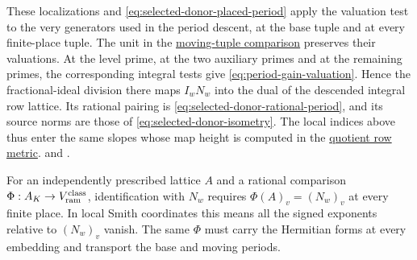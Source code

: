 These localizations and \eqref{eq:selected-donor-placed-period}
apply the valuation test to the very generators used in the
period descent, at the base tuple and at every finite-place tuple.
The unit in the \hyperlink{proof.local-unit-comparison}{moving-tuple comparison}
preserves their valuations. At the level prime, at the two
auxiliary primes and at the remaining primes, the corresponding
integral tests give \eqref{eq:period-gain-valuation}. Hence the
fractional-ideal division there maps \(I_wN_w\) into the dual of
the descended integral row lattice. Its rational pairing is
\eqref{eq:selected-donor-rational-period}, and its source norms
are those of \eqref{eq:selected-donor-isometry}. The local
indices above thus enter the same slopes whose map height is
computed in the \hyperlink{proof.divided-map-heights}{quotient row metric}.
 and
.

For an independently prescribed lattice \(A\) and a rational
comparison \(\Phi:A_K\to V_{\rm ram}^{\rm class}\), identification
with \(N_w\) requires \(\Phi(A)_v=(N_w)_v\) at every finite
place. In local Smith coordinates this means all the signed
exponents relative to \((N_w)_v\) vanish. The same \(\Phi\)
must carry the Hermitian forms at every embedding and transport
the base and moving periods.
